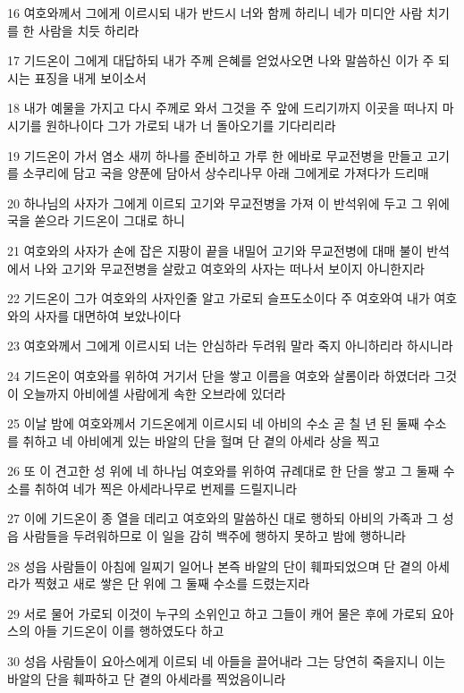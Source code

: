 \par 16 여호와께서 그에게 이르시되 내가 반드시 너와 함께 하리니 네가 미디안 사람 치기를 한 사람을 치듯 하리라
\par 17 기드온이 그에게 대답하되 내가 주께 은혜를 얻었사오면 나와 말씀하신 이가 주 되시는 표징을 내게 보이소서
\par 18 내가 예물을 가지고 다시 주께로 와서 그것을 주 앞에 드리기까지 이곳을 떠나지 마시기를 원하나이다 그가 가로되 내가 너 돌아오기를 기다리리라
\par 19 기드온이 가서 염소 새끼 하나를 준비하고 가루 한 에바로 무교전병을 만들고 고기를 소쿠리에 담고 국을 양푼에 담아서 상수리나무 아래 그에게로 가져다가 드리매
\par 20 하나님의 사자가 그에게 이르되 고기와 무교전병을 가져 이 반석위에 두고 그 위에 국을 쏟으라 기드온이 그대로 하니
\par 21 여호와의 사자가 손에 잡은 지팡이 끝을 내밀어 고기와 무교전병에 대매 불이 반석에서 나와 고기와 무교전병을 살랐고 여호와의 사자는 떠나서 보이지 아니한지라
\par 22 기드온이 그가 여호와의 사자인줄 알고 가로되 슬프도소이다 주 여호와여 내가 여호와의 사자를 대면하여 보았나이다
\par 23 여호와께서 그에게 이르시되 너는 안심하라 두려워 말라 죽지 아니하리라 하시니라
\par 24 기드온이 여호와를 위하여 거기서 단을 쌓고 이름을 여호와 살롬이라 하였더라 그것이 오늘까지 아비에셀 사람에게 속한 오브라에 있더라
\par 25 이날 밤에 여호와께서 기드온에게 이르시되 네 아비의 수소 곧 칠 년 된 둘째 수소를 취하고 네 아비에게 있는 바알의 단을 헐며 단 곁의 아세라 상을 찍고
\par 26 또 이 견고한 성 위에 네 하나님 여호와를 위하여 규례대로 한 단을 쌓고 그 둘째 수소를 취하여 네가 찍은 아세라나무로 번제를 드릴지니라
\par 27 이에 기드온이 종 열을 데리고 여호와의 말씀하신 대로 행하되 아비의 가족과 그 성읍 사람들을 두려워하므로 이 일을 감히 백주에 행하지 못하고 밤에 행하니라
\par 28 성읍 사람들이 아침에 일찌기 일어나 본즉 바알의 단이 훼파되었으며 단 곁의 아세라가 찍혔고 새로 쌓은 단 위에 그 둘째 수소를 드렸는지라
\par 29 서로 물어 가로되 이것이 누구의 소위인고 하고 그들이 캐어 물은 후에 가로되 요아스의 아들 기드온이 이를 행하였도다 하고
\par 30 성읍 사람들이 요아스에게 이르되 네 아들을 끌어내라 그는 당연히 죽을지니 이는 바알의 단을 훼파하고 단 곁의 아세라를 찍었음이니라
